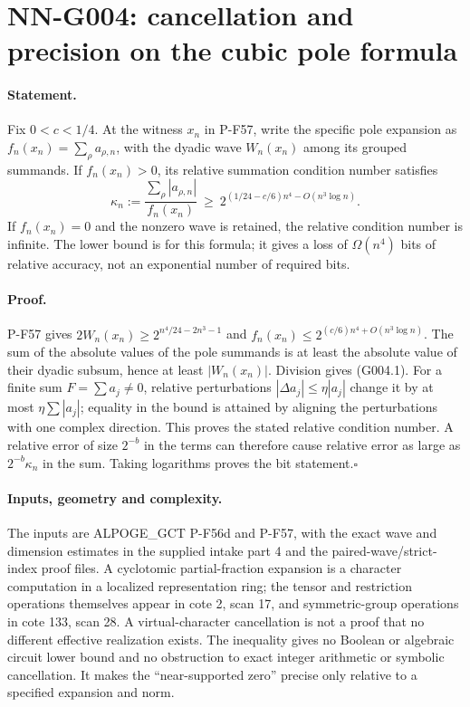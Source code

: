 \section{NN-G004: cancellation and precision on the cubic pole formula}
\paragraph{Statement.}
Fix $0<c<1/4$. At the witness $x_n$ in P-F57, write the specific
pole expansion as $f_n(x_n)=\sum_\rho a_{\rho,n}$, with the dyadic
wave $W_n(x_n)$ among its grouped summands. If $f_n(x_n)>0$, its
relative summation condition number satisfies
\[
 \kappa_n:=\frac{\sum_\rho|a_{\rho,n}|}{f_n(x_n)}
 \ \ge\ 2^{(1/24-c/6)n^4-O(n^3\log n)}.
 \tag{G004.1}
\]
If $f_n(x_n)=0$ and the nonzero wave is retained, the relative
condition number is infinite. The lower bound is for this formula;
it gives a loss of $\Omega(n^4)$ bits of relative accuracy, not an
exponential number of required bits.

\paragraph{Proof.}
P-F57 gives
$2W_n(x_n)\ge2^{n^4/24-2n^3-1}$ and
$f_n(x_n)\le2^{(c/6)n^4+O(n^3\log n)}$.
The sum of the absolute values of the pole summands is at least
the absolute value of their dyadic subsum, hence at least
$|W_n(x_n)|$. Division gives (G004.1).
For a finite sum $F=\sum a_j\ne0$, relative perturbations
$|\Delta a_j|\le\eta|a_j|$ change it by at most
$\eta\sum|a_j|$; equality in the bound is attained by aligning
the perturbations with one complex direction. This proves the
stated relative condition number. A relative error of size
$2^{-b}$ in the terms can therefore cause relative error as large
as $2^{-b}\kappa_n$ in the sum. Taking logarithms proves the bit
statement.\hfill$\square$

\paragraph{Inputs, geometry and complexity.}
The inputs are ALPOGE\_GCT P-F56d and P-F57, with the exact wave
and dimension estimates in the supplied intake part 4 and the
paired-wave/strict-index proof files. A cyclotomic partial-fraction
expansion is a character computation in a localized representation
ring; the tensor and restriction operations themselves appear in
cote 2, scan 17, and symmetric-group operations in cote 133,
scan 28. A virtual-character cancellation is not a proof that
no different effective realization exists. The inequality gives
no Boolean or algebraic circuit lower bound and no obstruction
to exact integer arithmetic or symbolic cancellation. It makes
the ``near-supported zero'' precise only relative to a specified
expansion and norm.



